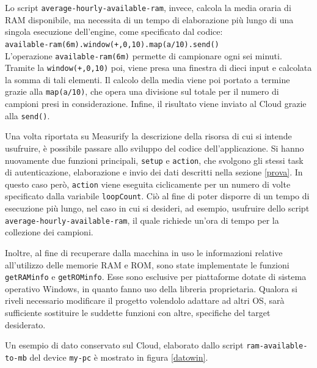 Lo script \texttt{average-hourly-available-ram}, invece, calcola la media oraria di RAM disponibile, ma necessita di un tempo di elaborazione più lungo di una singola esecuzione dell'engine, come specificato dal codice:\\ \texttt{available-ram(6m).window(+,0,10).map(a/10).send()}\\ L’operazione \texttt{available-ram(6m)} permette di campionare ogni sei minuti. Tramite la \texttt{window(+,0,10)} poi, viene presa una finestra di dieci input e calcolata la somma di tali elementi. Il calcolo della media viene poi portato a termine grazie alla \texttt{map(a/10)}, che opera una divisione sul totale per il numero di campioni presi in considerazione. Infine, il risultato viene inviato al Cloud grazie alla \texttt{send()}.

Una volta riportata su Measurify la descrizione della risorsa di cui si intende usufruire, è possibile passare allo sviluppo del codice dell'applicazione. Si hanno nuovamente due funzioni principali, \texttt{setup} e \texttt{action}, che svolgono gli stessi task di autenticazione, elaborazione e invio dei dati descritti nella sezione \ref{prova}. In questo caso però, \texttt{action} viene eseguita ciclicamente per un numero di volte specificato dalla variabile \texttt{loopCount}. Ciò al fine di poter disporre di un tempo di esecuzione più lungo, nel caso in cui si desideri, ad esempio, usufruire dello script \texttt{average-hourly-available-ram}, il quale richiede un'ora di tempo per la collezione dei campioni.

Inoltre, al fine di recuperare dalla macchina in uso le informazioni relative all'utilizzo delle memorie RAM e ROM, sono state implementate le funzioni \texttt{getRAMinfo} e  \texttt{getROMinfo}. Esse sono esclusive per piattaforme dotate di sistema operativo Windows, in quanto fanno uso della libreria proprietaria. Qualora si riveli necessario modificare il progetto volendolo adattare ad altri OS, sarà sufficiente sostituire le suddette funzioni con altre, specifiche del target desiderato.

Un esempio di dato conservato sul Cloud, elaborato dallo script \texttt{ram-available-to-mb} del device \texttt{my-pc} è mostrato in figura \ref{datowin}.

